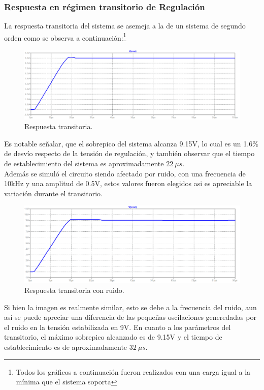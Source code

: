 \subsubsection{Respuesta en régimen transitorio de Regulación}
La respuesta transitoria del sistema se asemeja a la de un sistema de segundo orden como se observa a continuación:\footnote{Todos los gráficos a continuación fueron realizados con una carga igual a la mínima que el sistema soporta}
\begin{figure}[H]
\centering
	\includegraphics[width=1\textwidth]{ImagenesEjercicio2/transresp.png}
	\caption{Respuesta transitoria.}
	\label{fig:transitorioFuente}
\end{figure}
Es notable señalar, que el sobrepico del sistema alcanza 9.15V, lo cual es un 1.6$\%$ de desvío respecto de la tensión de regulación, y también observar que el tiempo de establecimiento del sistema es aproximadamente $22 \ \mu s$.\\
Además se simuló el circuito siendo afectado por ruido, con una frecuencia de 10kHz y una amplitud de 0.5V, estos valores fueron elegidos asi es apreciable la variación  durante el transitorio.
\begin{figure}[H]
\centering
	\includegraphics[width=1\textwidth]{ImagenesEjercicio2/transrespnoise.png}
	\caption{Respuesta transitoria con ruido.}
	\label{fig:transitorioFuentenoise}
\end{figure}
Si bien la imagen es realmente similar, esto se debe a la frecuencia del ruido, aun así se puede apreciar una diferencia de las pequeñas oscilaciones generedadas por el ruido en la tensión estabilizada en 9V. En cuanto a los parámetros del transitorio, el máximo sobrepico alcanzado es de 9.15V y el tiempo de establecimiento es de aproximadamente $32 \ \mu s$.

